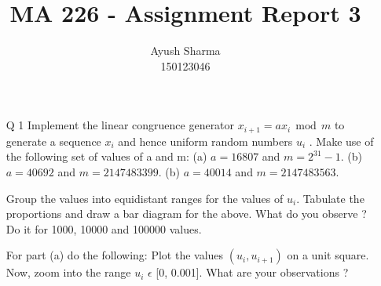 \documentclass[11pt]{article}
\title{MA 226 - Assignment Report 3}
\author{Ayush Sharma\\150123046}
\begin{document}
\titlepage
\newpage

\begin{enumerate}
\item[Q 1]  Implement the linear congruence generator
$x_{i+1} = a x_i ~~ \mbox{mod} ~~ m$
to generate a sequence $x_i$ and hence uniform random numbers $u_i$ .
Make use of the following set of values of a and m:
(a) $a = 16807$ and $m = 2^{31} - 1$.
(b) $a = 40692$ and $m = 2147483399$.
(b) $a = 40014$ and $m = 2147483563$.

Group the values into equidistant ranges for the values of $u_{i}$. Tabulate the proportions and draw a bar diagram for the above. What do you observe ? Do it for 1000, 10000 and 100000 values.

For part (a) do the following: Plot the values $(u_{i}, u_{i+1})$ on a unit square. Now, zoom into the range $u_{i}$ $\epsilon$ [0, 0.001]. What are your observations ?
\end{enumerate}

\end{document}
